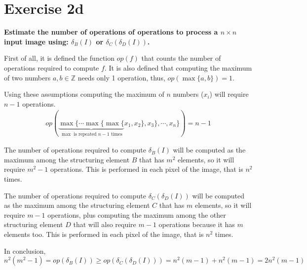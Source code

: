 \section*{Exercise 2d}

{
\bfseries
Estimate the number of operations of operations to process a $n \times n$ input image using: $\delta_B(I)$ or $\delta_C\left(\delta_D \left( I \right) \right)$.
}

\begin{center}
\end{center}

First of all, it is defined the function $op(f)$ that counts the number of operations required to compute $f$. It is also defined that computing the maximum of two numbers $a, b \in \mathbb{Z}$ needs only 1 operation, thus, $op\left(\max\{a, b\}\right) = 1$.

Using these assumptions computing the maximum of $n$ numbers ($x_i$) will require $n - 1$ operations.
\begin{gather*}
    op(\underbrace{\max\{\cdots\max\{\max\{}_{\max{} \text{ is repeated } n - 1 \text{ times}}x_1, x_2\}, x_3\},\cdots,x_n\}) = n - 1
\end{gather*}

The number of operations required to compute $\delta_B(I)$ will be computed as the maximum among the structuring element $B$ that has $m^2$ elements, so it will require $m^2 - 1$ operations. This is performed in each pixel of the image, that is $n^2$ times.

The number of operations required to compute $\delta_C\left(\delta_D \left( I \right) \right)$ will be computed as the maximum among the structuring element $C$ that has $m$ elements, so it will require $m - 1$ operations, plus computing the maximum among the other structuring element $D$ that will also require $m - 1$ operations because it has $m$ elements too. This is performed in each pixel of the image, that is $n^2$ times.

In conclusion,
$$
    n^2(m^2 - 1) = op\left(\delta_B(I)\right) \geq op\left(\delta_C\left(\delta_D \left( I \right) \right)\right) = n^2(m - 1) + n^2(m - 1) = 2n^2(m - 1)
$$
